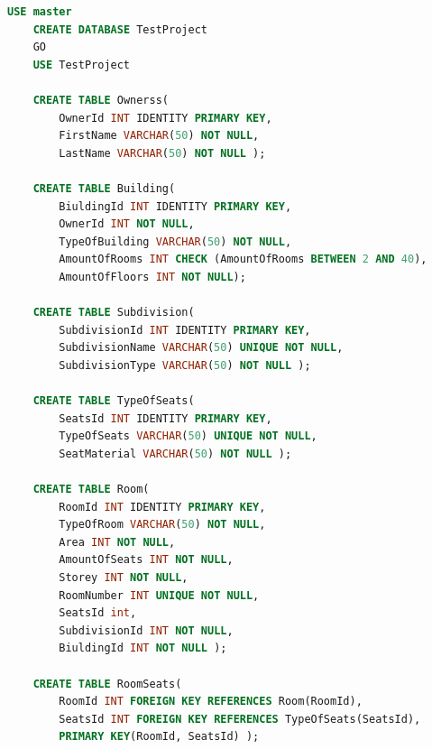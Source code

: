 \documentclass[a4paper,12pt]{article}
\begin{document}
	\begin{lstlisting}[language=SQL]
	USE master
	CREATE DATABASE TestProject
	GO
	USE TestProject
	
	CREATE TABLE Ownerss(
		OwnerId INT IDENTITY PRIMARY KEY,
		FirstName VARCHAR(50) NOT NULL,
		LastName VARCHAR(50) NOT NULL );
	
	CREATE TABLE Building(
		BiuldingId INT IDENTITY PRIMARY KEY,
		OwnerId INT NOT NULL,
		TypeOfBuilding VARCHAR(50) NOT NULL,
		AmountOfRooms INT CHECK (AmountOfRooms BETWEEN 2 AND 40),
		AmountOfFloors INT NOT NULL); 
	
	CREATE TABLE Subdivision(
		SubdivisionId INT IDENTITY PRIMARY KEY,
		SubdivisionName VARCHAR(50) UNIQUE NOT NULL,
		SubdivisionType VARCHAR(50) NOT NULL );
	
	CREATE TABLE TypeOfSeats(
		SeatsId INT IDENTITY PRIMARY KEY,
		TypeOfSeats VARCHAR(50) UNIQUE NOT NULL,
		SeatMaterial VARCHAR(50) NOT NULL ); 
	
	CREATE TABLE Room(
		RoomId INT IDENTITY PRIMARY KEY,
		TypeOfRoom VARCHAR(50) NOT NULL,
		Area INT NOT NULL, 
		AmountOfSeats INT NOT NULL, 
		Storey INT NOT NULL,
		RoomNumber INT UNIQUE NOT NULL,
		SeatsId int, 
		SubdivisionId INT NOT NULL,
		BiuldingId INT NOT NULL );
	
	CREATE TABLE RoomSeats(
		RoomId INT FOREIGN KEY REFERENCES Room(RoomId),
		SeatsId INT FOREIGN KEY REFERENCES TypeOfSeats(SeatsId),
		PRIMARY KEY(RoomId, SeatsId) );
	\end{lstlisting}
\end{document}
